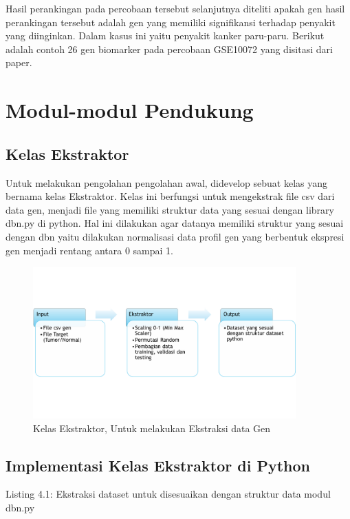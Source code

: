 Hasil perankingan pada percobaan tersebut selanjutnya diteliti apakah gen hasil perankingan tersebut adalah gen yang memiliki signifikansi terhadap penyakit yang diinginkan. Dalam kasus ini yaitu penyakit kanker paru-paru. Berikut adalah contoh 26 gen biomarker pada percobaan GSE10072 yang disitasi dari paper. 

\section{Modul-modul Pendukung}
\subsection{Kelas Ekstraktor}
Untuk melakukan pengolahan pengolahan awal, didevelop sebuat kelas yang bernama kelas Ekstraktor. Kelas ini berfungsi untuk mengekstrak file csv dari data gen, menjadi file yang memiliki struktur data yang sesuai dengan library dbn.py di python. Hal ini dilakukan agar datanya memiliki struktur yang sesuai dengan dbn yaitu dilakukan normalisasi data profil gen yang berbentuk ekspresi gen menjadi rentang antara 0 sampai 1.

\begin{figure}
	\centering
	\includegraphics[width=0.9\textwidth]
		{pics/ekstraktor.png}
	\caption{Kelas Ekstraktor, Untuk melakukan Ekstraksi data Gen}
	\label{fig:preproses}
\end{figure}

\subsection{Implementasi Kelas Ekstraktor di Python}
Listing 4.1: Ekstraksi dataset untuk disesuaikan dengan struktur data modul dbn.py


